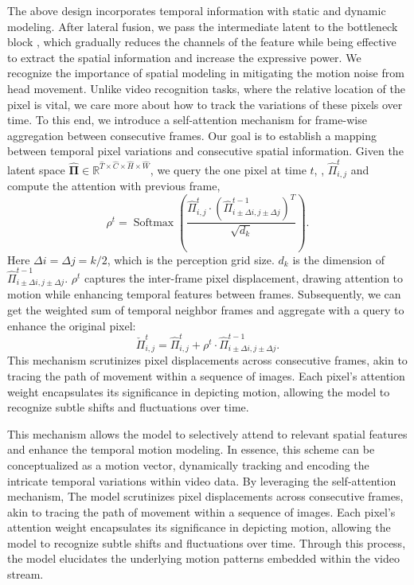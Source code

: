 The above design incorporates temporal information with static and dynamic modeling. After lateral fusion, we pass the intermediate latent to the bottleneck block
, which gradually reduces the channels of the feature while being effective to extract the spatial information and increase the expressive power. 
We recognize the importance of spatial modeling in mitigating the motion noise from head movement. Unlike video recognition tasks, where the relative location of the pixel is vital, we care more about how to track the variations of these pixels over time. To this end, we introduce a self-attention mechanism for frame-wise aggregation between consecutive frames. Our goal is to establish a mapping between temporal pixel variations and consecutive spatial information.  Given the latent space $\bm{\hat{\Pi}} \in \mathbb{R}^{\hat{T} \times \hat{C} \times \hat{H} \times \hat{W}} $, we query the one pixel at time $t$, \ie,  $\hat{\Pi}^{t}_{i,j}$ and compute the attention with previous frame,
\begin{equation}
    \rho^{t} = \operatorname{Softmax}\left(\frac{\hat{\Pi}^{t}_{i,j} \cdot \left(\hat{\Pi}^{t-1}_{i \pm \Delta i, j \pm \Delta j}\right)^T}{\sqrt{d_k}}\right).
\end{equation}
Here $\Delta i=\Delta j=k/2$, which is the perception grid size. $d_k$ is the dimension of $\hat{\Pi}^{t-1}_{i \pm \Delta i, j \pm \Delta j}$. $\rho^t$ captures the inter-frame pixel displacement, drawing attention to motion while enhancing temporal features between frames. Subsequently, we can get the weighted sum of temporal neighbor frames and aggregate with a query to enhance the original pixel:
\begin{equation}
    \check{\Pi}^{t}_{i,j} = \hat{\Pi}^{t}_{i,j} + \rho^{t} \cdot \hat{\Pi}^{t-1}_{i \pm \Delta i, j \pm \Delta j}.
\end{equation}
This mechanism scrutinizes pixel displacements across consecutive frames, akin to tracing the path of movement within a sequence of images. Each pixel's attention weight encapsulates its significance in depicting motion, allowing the model to recognize subtle shifts and fluctuations over time. 

This mechanism allows the model to selectively attend to relevant spatial features and enhance the temporal motion modeling. 
In essence, this scheme can be conceptualized as a motion vector, dynamically tracking and encoding the intricate temporal variations within video data. 
By leveraging the self-attention mechanism, 
The model scrutinizes pixel displacements across consecutive frames, akin to tracing the path of movement within a sequence of images. Each pixel's attention weight encapsulates its significance in depicting motion, allowing the model to recognize subtle shifts and fluctuations over time. Through this process, the model 
elucidates the underlying motion patterns embedded within the video stream. 

